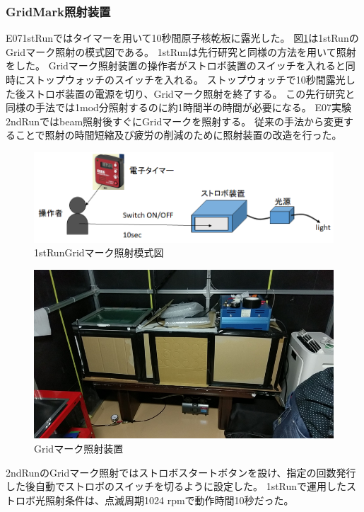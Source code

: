 \documentclass[12pt,a4paper]{jarticle}
\begin{document}
\subsubsection{GridMark照射装置}
E071stRunではタイマーを用いて10秒間原子核乾板に露光した。
図\ref{fig:grid_1stRun}は1stRunのGridマーク照射の模式図である。
1stRunは先行研究と同様の方法を用いて照射をした。\cite{tamura}
Gridマーク照射装置の操作者がストロボ装置のスイッチを入れると同時にストップウォッチのスイッチを入れる。
ストップウォッチで10秒間露光した後ストロボ装置の電源を切り、Gridマーク照射を終了する。
この先行研究と同様の手法では1mod分照射するのに約1時間半の時間が必要になる。
E07実験2ndRunではbeam照射後すぐにGridマークを照射する。
従来の手法から変更することで照射の時間短縮及び疲労の削減のために照射装置の改造を行った。
\begin{figure}[htbp]
  \centering
     \includegraphics[width=140mm]{grid_1stRun.png}
  \caption{1stRunGridマーク照射模式図\label{fig:grid_1stRun}}
\end{figure}
\begin{figure}[htbp]
  \centering
     \includegraphics[width=140mm]{grid_printer.png}
  \caption{Gridマーク照射装置\label{fig:grid_masi-nn}}
\end{figure}
\par
2ndRunのGridマーク照射ではストロボスタートボタンを設け、指定の回数発行した後自動でストロボのスイッチを切るように設定した。
1stRunで運用したストロボ光照射条件は、点滅周期1024 rpmで動作時間10秒だった。\cite{tamura}
\end{document}
